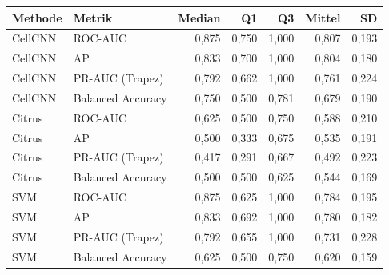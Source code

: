 \begin{tabular}{llrrrrr}
\toprule
Methode & Metrik & Median & Q1 & Q3 & Mittel & SD \\
\midrule
CellCNN & ROC-AUC & 0,875 & 0,750 & 1,000 & 0,807 & 0,193 \\
CellCNN & AP & 0,833 & 0,700 & 1,000 & 0,804 & 0,180 \\
CellCNN & PR-AUC (Trapez) & 0,792 & 0,662 & 1,000 & 0,761 & 0,224 \\
CellCNN & Balanced Accuracy & 0,750 & 0,500 & 0,781 & 0,679 & 0,190 \\
Citrus & ROC-AUC & 0,625 & 0,500 & 0,750 & 0,588 & 0,210 \\
Citrus & AP & 0,500 & 0,333 & 0,675 & 0,535 & 0,191 \\
Citrus & PR-AUC (Trapez) & 0,417 & 0,291 & 0,667 & 0,492 & 0,223 \\
Citrus & Balanced Accuracy & 0,500 & 0,500 & 0,625 & 0,544 & 0,169 \\
SVM & ROC-AUC & 0,875 & 0,625 & 1,000 & 0,784 & 0,195 \\
SVM & AP & 0,833 & 0,692 & 1,000 & 0,780 & 0,182 \\
SVM & PR-AUC (Trapez) & 0,792 & 0,655 & 1,000 & 0,731 & 0,228 \\
SVM & Balanced Accuracy & 0,625 & 0,500 & 0,750 & 0,620 & 0,159 \\
\bottomrule
\end{tabular}
